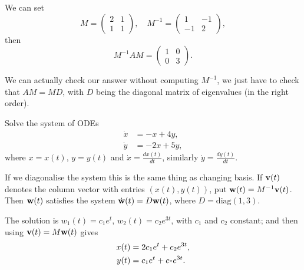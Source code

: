 \documentclass[10pt, a4paper]{article}
\begin{document}
\begin{example}
\begin{solution}
        We can set
        \[
        M = \begin{pmatrix}
            2 & 1 \\ 1 & 1
        \end{pmatrix},\quad
        M ^ {-1} =\begin{pmatrix}
            1 & -1 \\ -1 & 2
        \end{pmatrix},
        \]
        then
        \[
        M ^ {-1}AM = \begin{pmatrix}
            1 & 0 \\ 0 & 3
        \end{pmatrix}.
        \]
    \end{solution}
\end{example}

\begin{remark}
    We can actually check our answer without computing $M ^ {-1}$,
    we just have to check that $AM = MD$,
    with $D$ being the diagonal matrix of eigenvalues
    (in the right order).
\end{remark}

\begin{example}
    Solve the system of ODEs
    \begin{align*}
        \dot{x} &= -x + 4y, \\
        \dot{y} &= -2x + 5y,
    \end{align*}
    where $x = x(t)$,
    $y = y(t)$ and $\dot{x} = \frac{dx(t)}{dt}$,
    similarly $\dot{y} = \frac{dy(t)}{dt}$.
    \begin{solution}
        If we diagonalise the system this is the same thing as changing basis.
        If $\mathbf{v}(t)$ denotes the column vector with entries $(x(t), y(t))$,
        put $\mathbf{w}(t) = M ^ {-1}\mathbf{v}(t)$.
        Then $\mathbf{w}(t)$ satisfies the system $\dot{\mathbf{w}}(t) = D\mathbf{w}(t)$,
        where $D = \mathrm{diag}(1, 3)$.

        The solution is $w_1(t) = c_1e ^ t$,
        $w_2(t) = c_2e ^ {3t}$,
        with $c_1$ and $c_2$ constant;
        and then using $\mathbf{v}(t) = M\mathbf{w}(t)$ gives
        \begin{align*}
            x(t) &= 2c_1e ^ t + c_2e ^ {3t}, \\
            y(t) &= c_1e ^ t + c_"e ^ {3t}.
        \end{align*}
    \end{solution}
\end{example}
\end{document}
